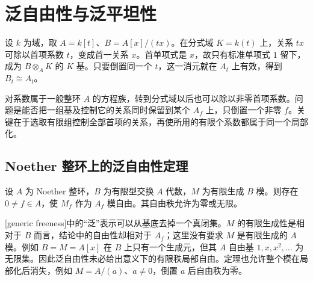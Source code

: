 
\section{泛自由性与泛平坦性}
\label{b3:sec:1204}

设 \(k\) 为域，取 \(A=k[t]\)、\(B=A[x]/(tx)\)。在分式域 \(K=k(t)\) 上，关系 \(tx\) 可除以首项系数 \(t\)，变成首一关系 \(x\)。首单项式是 \(x\)，故只有标准单项式 \(1\) 留下，成为 \(B\otimes_AK\) 的 \(K\) 基。只要倒置同一个 \(t\)，这一消元就在 \(A_t\) 上有效，得到 \(B_t\cong A_t\)。

对系数属于一般整环 \(A\) 的方程族，转到分式域以后也可以除以非零首项系数。问题是能否把一组基及控制它的关系同时保留到某个 \(A_f\) 上，只倒置一个非零 \(f\)。关键在于选取有限组控制全部首项的关系，再使所用的有限个系数都属于同一个局部化。


\subsection{Noether 整环上的泛自由性定理}
\label{b3:subsec:1204:01}

\begin{theorem}[泛自由性]\label{b3:thm:generic-freeness}
	设 \(A\) 为 Noether 整环，\(B\) 为有限型交换 \(A\) 代数，\(M\) 为有限生成 \(B\) 模。则存在 \(0\ne f\in A\)，使 \(M_f\) 作为 \(A_f\) 模自由。其自由秩允许为零或无限。
\end{theorem}

[generic freeness]中的“泛”表示可以从基底去掉一个真闭集。\(M\) 的有限生成性是相对于 \(B\) 而言，结论中的自由性却相对于 \(A_f\)；这里没有要求 \(M\) 是有限生成的 \(A\) 模。例如 \(B=M=A[x]\) 在 \(B\) 上只有一个生成元，但其 \(A\) 自由基 \(1,x,x^2,\ldots\) 为无限集。因此泛自由性未必给出意义下的有限秩局部自由。定理也允许整个模在局部化后消失，例如 \(M=A/(a)\)、\(a\ne0\)，倒置 \(a\) 后自由秩为零。

